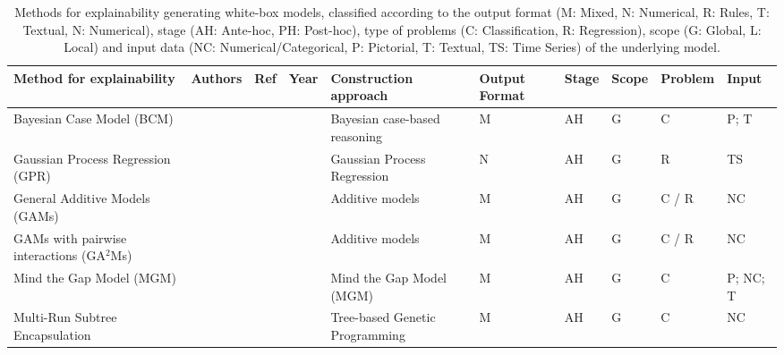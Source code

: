\documentclass[final,1p,times]{elsarticle}
\begin{document}
\begin{table}[htbp]
\footnotesize
    \caption{Methods for explainability generating white-box models, classified according to the output format (M: Mixed, N: Numerical, R: Rules, T: Textual, N: Numerical), stage (AH: Ante-hoc, PH: Post-hoc), type of problems (C: Classification, R: Regression), scope (G: Global, L: Local) and input data (NC: Numerical/Categorical, P: Pictorial, T: Textual, TS: Time Series) of the underlying model.}
    \label{tab:white-box}
    \begin{tabular}{m{2cm} m{1.5cm} m{0.5cm} m{0.5cm} m{1.5cm} m{0.85cm} m{0.5cm} m{0.6cm} m{0.8cm} m{0.7cm}}
    \hline
    Method for \newline explainability & Authors & Ref & Year & Construction \newline approach & Output Format & Stage & Scope & Problem & Input\\
    \hline
    Bayesian Case Model (BCM) &  \citeauthor{kim2014bayesian} &  \cite{kim2014bayesian} &  \citeyear{kim2014bayesian} & Bayesian case-based reasoning & M & AH & G & C & P; T\\
    Gaussian Process Regression (GPR) &  \citeauthor{caywood2017gaussian} &  \cite{caywood2017gaussian} &  \citeyear{caywood2017gaussian} & Gaussian Process Regression & N & AH & G & R & TS\\
    General Additive Models (GAMs) &  \citeauthor{lou2012intelligible,lou2013accurate} &  \cite{lou2012intelligible,lou2013accurate} &  \citeyear{lou2012intelligible} & Additive models & M & AH & G & C / R & NC\\
    GAMs with pairwise interactions (GA$^2$Ms) &  \citeauthor{caruana2015intelligible,lou2013accurate} &  \cite{caruana2015intelligible} &  \citeyear{caruana2015intelligible} & Additive models & M & AH & G & C / R & NC\\
    Mind the Gap Model (MGM) &  \citeauthor{kim2015mind} &  \cite{kim2015mind} &  \citeyear{kim2015mind} & Mind the Gap Model (MGM) & M & AH & G & C & P; NC; T\\
    Multi-Run Subtree Encapsulation &  \citeauthor{howard2018explainable} &  \cite{howard2018explainable} &  \citeyear{howard2018explainable} & Tree-based Genetic Programming & M & AH & G & C & NC\\

\end{tabular}
\end{table}
\end{document}
